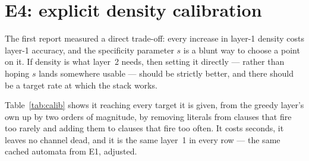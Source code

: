 \section{E4: explicit density calibration}
\label{sec:density}

 The first report measured a direct trade-off: every increase in
layer-1 density costs layer-1 accuracy, and the specificity parameter $s$ is a blunt way to
choose a point on it. If density is what layer~2 needs, then setting it directly --- rather
than hoping $s$ lands somewhere usable --- should be strictly better, and there should be a
target rate at which the stack works.

 Table~\ref{tab:calib} shows it reaching every target it is
given, from the greedy layer's own  up by two orders of magnitude, by removing
literals from clauses that fire too rarely and adding them to clauses that fire too often. It
costs seconds, it leaves no channel dead, and it is the same layer~1 in every row --- the same
cached automata from E1, adjusted.

\begin{table}[h]
\centering\small
\caption{The target sweep.  is the requested per-patch firing rate, in percent;
 and  are the median rates achieved before and after the
$\poolK\times\poolK$ OR pool;  is the median clause size the controller left behind
(the uncalibrated greedy layer has \densityGreedySize{});  the fraction of
channels landing inside the tolerance;  the number of single-literal adjustments
needed. Accuracy is the full two-layer stack, three seeds.}
\label{tab:calib}
\end{table}

